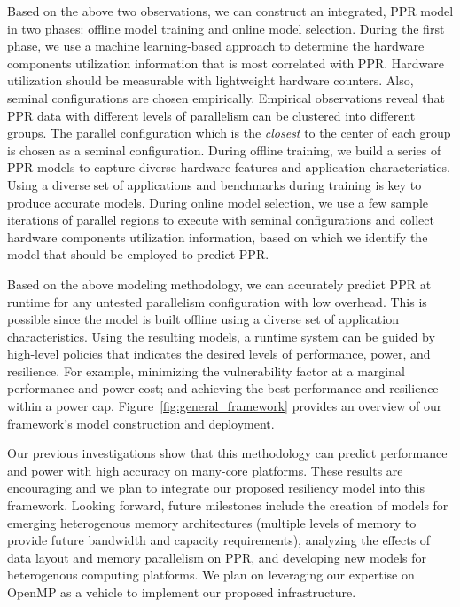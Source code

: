 \documentclass{article}  %
\begin{document}
Based on the above two observations, we can construct an integrated,
PPR model in two phases: offline model training and
online model selection. During the first phase, we use a machine
learning-based approach to determine the hardware components
utilization information that is most correlated with PPR.  
Hardware utilization should be measurable with lightweight hardware
counters. Also, seminal configurations are chosen empirically.
Empirical observations reveal that PPR data with different levels
of parallelism can be clustered into different groups. The parallel configuration
which is the \emph{closest} to the center of each group is chosen as a 
seminal configuration. 
During offline training, we build a series of PPR models to
capture diverse hardware features and application
characteristics. Using a diverse set of applications and benchmarks
during training is key to produce accurate models. 
During online model selection, we use a few sample iterations of
parallel regions to execute with seminal configurations and collect
hardware components utilization information, based on which we
identify the model that should be employed to predict PPR. 

Based on the above modeling methodology, we can accurately predict PPR
at runtime for any untested parallelism configuration with low
overhead. This is possible since the model is built offline using
a diverse set of application characteristics. Using
the resulting models, a runtime system can be 
guided by high-level policies that indicates the desired levels of
performance, power, and resilience. For example, minimizing the
vulnerability factor at a marginal performance and power cost; and
achieving the best performance and resilience within a power
cap. Figure~\ref{fig:general_framework} provides an overview of our 
framework's model construction and deployment.

Our previous investigations show that this methodology can
predict performance and power with high accuracy on many-core
platforms. These results are encouraging and we plan to integrate our
proposed resiliency model into this framework. Looking forward, future
milestones include the creation of models for emerging heterogenous
memory architectures (multiple levels of memory to provide future
bandwidth and capacity requirements), analyzing the effects of data
layout and memory parallelism on PPR, and developing new models for
heterogenous computing platforms. We plan on leveraging our expertise
on OpenMP as a vehicle to implement our proposed infrastructure. 
\end{document}
